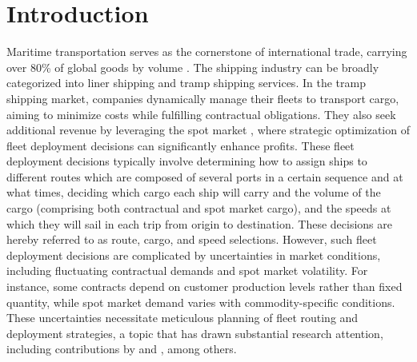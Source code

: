\documentclass[11pt,english]{article}
\begin{document}
\section{Introduction}
Maritime transportation serves as the cornerstone of international trade, carrying over 80\% of global goods by volume \citep{unctad2021review}. The shipping industry can be broadly categorized into liner shipping and tramp shipping services.
In the tramp shipping market, companies dynamically manage their fleets to transport cargo, aiming to minimize costs while fulfilling contractual obligations. They also seek additional revenue by leveraging the spot market \citep{wang2021carrier}, where strategic optimization of fleet deployment decisions can significantly enhance profits. These fleet deployment decisions typically involve determining how to assign ships to different routes which are composed of several ports in a certain sequence and at what times, deciding which cargo each ship will carry and the volume of the cargo (comprising both contractual and spot market cargo), and the speeds at which they will sail in each trip from origin to destination. These decisions are hereby referred to as route, cargo, and speed selections. However, such fleet deployment decisions are complicated by uncertainties in market conditions, including fluctuating contractual demands and spot market volatility. For instance, some contracts depend on customer production levels rather than fixed quantity, while spot market demand varies with commodity-specific conditions. These uncertainties necessitate meticulous planning of fleet routing and deployment strategies, a topic that has drawn substantial research attention, including contributions by \cite{gelareh2010novel} and \cite{andersson2015integrated}, among others.
\end{document}
